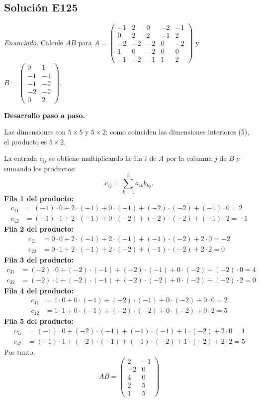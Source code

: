 \documentclass[12pt]{article}
\theoremstyle{remark}
\newcommand{\solucion}[2]{\Needspace{11\baselineskip}\subsection*{Solución E#1}\noindent\textit{Enunciado:} #2\par\medskip\noindent\textbf{Desarrollo paso a paso.}\par\medskip}
\begin{document}
\medskip

\solucion{125}{Calcule $AB$ para $A=\begin{pmatrix}-1&2&0&-2&-1\\0&2&2&-1&2\\-2&-2&-2&0&-2\\1&0&-2&0&0\\-1&-2&-1&1&2\end{pmatrix}$ y $B=\begin{pmatrix}0&1\\-1&-1\\-1&-2\\-2&-2\\0&2\end{pmatrix}$.}
Las dimensiones son $5\times5$ y $5\times2$; como coinciden las dimensiones interiores (5), el producto es $5\times2$.

La entrada $c_{ij}$ se obtiene multiplicando la fila $i$ de $A$ por la columna $j$ de $B$ y sumando los productos:
\[
c_{ij}=\sum_{k=1}^{5} a_{ik}b_{kj}.
\]
\textbf{Fila 1 del producto:}
\[
\begin{aligned}c_{11}&=(-1)\cdot 0+2\cdot (-1)+0\cdot (-1)+(-2)\cdot (-2)+(-1)\cdot 0=2\\c_{12}&=(-1)\cdot 1+2\cdot (-1)+0\cdot (-2)+(-2)\cdot (-2)+(-1)\cdot 2=-1\end{aligned}
\]
\textbf{Fila 2 del producto:}
\[
\begin{aligned}c_{21}&=0\cdot 0+2\cdot (-1)+2\cdot (-1)+(-1)\cdot (-2)+2\cdot 0=-2\\c_{22}&=0\cdot 1+2\cdot (-1)+2\cdot (-2)+(-1)\cdot (-2)+2\cdot 2=0\end{aligned}
\]
\textbf{Fila 3 del producto:}
\[
\begin{aligned}c_{31}&=(-2)\cdot 0+(-2)\cdot (-1)+(-2)\cdot (-1)+0\cdot (-2)+(-2)\cdot 0=4\\c_{32}&=(-2)\cdot 1+(-2)\cdot (-1)+(-2)\cdot (-2)+0\cdot (-2)+(-2)\cdot 2=0\end{aligned}
\]
\textbf{Fila 4 del producto:}
\[
\begin{aligned}c_{41}&=1\cdot 0+0\cdot (-1)+(-2)\cdot (-1)+0\cdot (-2)+0\cdot 0=2\\c_{42}&=1\cdot 1+0\cdot (-1)+(-2)\cdot (-2)+0\cdot (-2)+0\cdot 2=5\end{aligned}
\]
\textbf{Fila 5 del producto:}
\[
\begin{aligned}c_{51}&=(-1)\cdot 0+(-2)\cdot (-1)+(-1)\cdot (-1)+1\cdot (-2)+2\cdot 0=1\\c_{52}&=(-1)\cdot 1+(-2)\cdot (-1)+(-1)\cdot (-2)+1\cdot (-2)+2\cdot 2=5\end{aligned}
\]
Por tanto,
\[
\boxed{AB=\begin{pmatrix}2&-1\\-2&0\\4&0\\2&5\\1&5\end{pmatrix}}
\]
\end{document}
